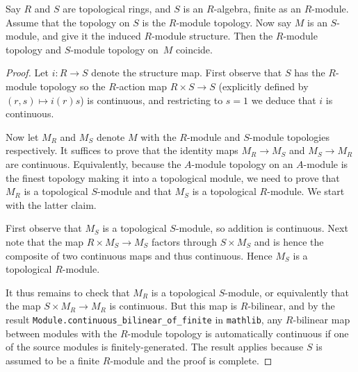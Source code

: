 \begin{lemma}
  \label{IsModuleTopology.continuous_bilinear_of_finite_left}
  \leanok
  Say $R$ and $S$ are topological rings, and $S$ is an $R$-algebra, finite as an $R$-module.
  Assume that the topology
  on $S$ is the $R$-module topology. Now say $M$ is an $S$-module, and give it the induced
  $R$-module structure. Then the $R$-module topology and $S$-module topology on~$M$ coincide.
\end{lemma}
\begin{proof}
  \leanok
  Let $i:R\to S$ denote the structure map. First observe that $S$ has the $R$-module topology
  so the $R$-action map $R\times S\to S$ (explicitly defined by $(r,s)\mapsto i(r)s$)
  is continuous, and restricting to $s=1$ we deduce that $i$ is continuous.

  Now let $M_R$ and $M_S$ denote $M$ with the $R$-module and $S$-module topologies respectively.
  It suffices to prove that the identity maps $M_R\to M_S$ and $M_S\to M_R$ are continuous.
  Equivalently, because the $A$-module topology on an $A$-module is the finest topology
  making it into a topological module, we need to prove that $M_R$ is a topological $S$-module
  and that $M_S$ is a topological $R$-module. We start with the latter claim.

  First observe that $M_S$ is a topological $S$-module, so addition is continuous.
  Next note that the map $R\times M_S\to M_S$ factors through $S\times M_S$ and is hence the
  composite of two continuous maps and thus continuous. Hence $M_S$ is a topological $R$-module.

  It thus remains to check that $M_R$ is a topological $S$-module, or equivalently
  that the map $S\times M_R\to M_R$ is continuous. But this map is $R$-bilinear, and
  by the result {\tt Module.continuous\_bilinear\_of\_finite} in {\tt mathlib}, any
  $R$-bilinear map between modules with the $R$-module topology is automatically continuous
  if one of the source modules is finitely-generated. The result applies because $S$ is
  assumed to be a finite $R$-module and the proof is complete.
\end{proof}

